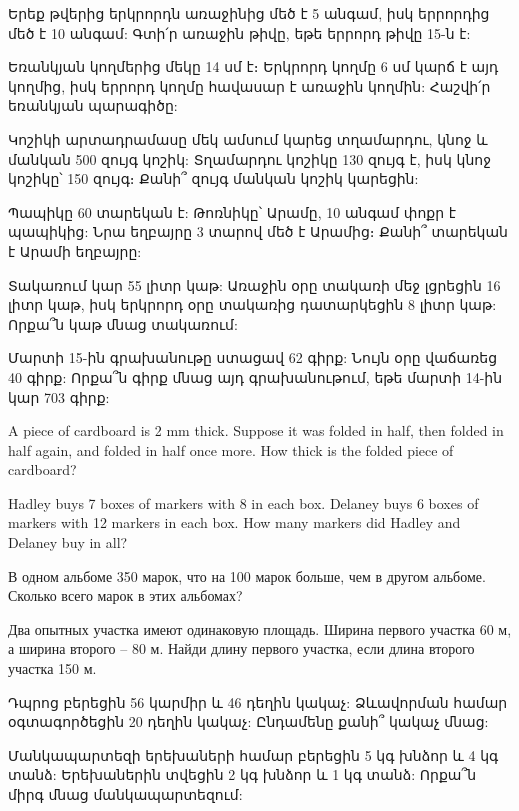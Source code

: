 





\textproblem Երեք թվերից երկրորդն առաջինից մեծ է 5 անգամ,
իսկ երրորդից մեծ է 10 անգամ: Գտի՛ր առաջին թիվը, եթե երրորդ
թիվը 15-ն է:

\textproblem Եռանկյան կողմերից մեկը 14 սմ է։ Երկրորդ կողմը
6 սմ կարճ է այդ կողմից, իսկ երրորդ կողմը հավասար է առաջին
կողմին: Հաշվի՛ր եռանկյան պարագիծը:

\textproblem Կոշիկի արտադրամասը մեկ ամսում կարեց տղամարդու,
կնոջ և մանկան 500 զույգ կոշիկ: Տղամարդու կոշիկը 130 զույգ 
է, իսկ կնոջ կոշիկը՝ 150 զույգ։ Քանի՞ զույգ մանկան կոշիկ 
կարեցին:

\textproblem Պապիկը 60 տարեկան է: Թոռնիկը՝ Արամը, 10 անգամ
փոքր է պապիկից: Նրա եղբայրը 3 տարով մեծ է Արամից։ Քանի՞
տարեկան է Արամի եղբայրը:

\textproblem Տակառում կար 55 լիտր կաթ: Առաջին օրը տակառի 
մեջ լցրեցին 16 լիտր կաթ, իսկ երկրորդ օրը տակառից դատարկեցին 
8 լիտր կաթ: Որքա՞ն կաթ մնաց տակառում:

\textproblem Մարտի 15-ին գրախանութը ստացավ 62 գիրք: Նույն 
օրը վաճառեց 40 գիրք: Որքա՞ն գիրք մնաց այդ գրախանութում, 
եթե մարտի 14-ին կար 703 գիրք:

\textproblem A piece of cardboard is 2 mm thick. Suppose
it was folded in half, then folded in half again, and
folded in half once more. How thick is the folded piece
of cardboard?

\textproblem Hadley buys 7 boxes of markers with 8 in each box.
Delaney buys 6 boxes of markers with 12 markers in each box.
How many markers did Hadley and Delaney buy in all?

\textproblem В одном альбоме 350 марок, что на  100 марок
больше, чем в другом альбоме. Сколько  всего марок в этих
альбомах?

\textproblem  Два опытных участка имеют одинаковую площадь.
Ширина первого участка 60 м, а ширина второго – 80 м. Найди
длину первого участка, если длина второго участка 150 м.

\textproblem Դպրոց բերեցին 56 կարմիր և 46 դեղին կակաչ: 
Ձևավորման համար օգտագործեցին 20 դեղին կակաչ: Ընդամենը 
քանի՞ կակաչ մնաց:

\textproblem Մանկապարտեզի երեխաների համար բերեցին 5 կգ 
խնձոր և 4 կգ տանձ: Երեխաներին տվեցին 2 կգ խնձոր և 1 կգ 
տանձ: Որքա՞ն միրգ մնաց մանկապարտեզում:

